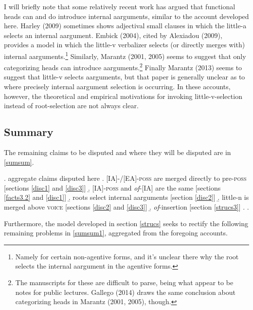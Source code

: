 \documentclass[12pt]{article}
\begin{document}
I will briefly note that some relatively recent work has argued that functional heads can and do introduce internal aarguments, similar to the account developed here. Harley (2009) sometimes shows adjectival small clauses in which the little-a selects an internal aargument. Embick (2004), cited by Alexiadou (2009), provides a model in which the little-v verbalizer selects (or directly merges with) internal aarguments.\footnote{ Namely for certain non-agentive forms, and it's unclear there why the root selects the internal aargument in the agentive forms.} Similarly, Marantz (2001, 2005) seems to suggest that only categorizing heads can introduce aarguments.\footnote{ The manuscripts for these are difficult to parse, being what appear to be notes for public lectures. Gallego (2014) draws the same conclusion about categorizing heads in Marantz (2001, 2005), though.} Finally Marantz (2013) seems to suggest that little-v selects aarguments, but that paper is generally unclear as to where precisely internal aargument selection is occurring. In these accounts, however, the theoretical and empirical motivations for invoking little-v-selection instead of root-selection are not always clear.

\subsection{Summary} \label{priors4}

The remaining claims to be disputed and where they will be disputed are in \ref{sumsum}.

\singlespacing

\ex. \label{sumsum} aggregate claims disputed here
\a. [IA]-/[EA]-\textsc{poss} are merged directly to pre-\textsc{poss} \hfill [sections \ref{disc1} and \ref{disc3}]
\b. [IA]-\textsc{poss} and \textit{of}-[IA] are the same \hfill [sections \ref{facts3.2} and \ref{disc1}]
\b. roots select internal aarguments \hfill [section \ref{disc2}] 
\b. little-n is merged above \textsc{voice} \hfill [sections \ref{disc2} and \ref{disc3}]
\b. \textit{of}-insertion \hfill [section \ref{strucs3}]
\z. \z. \par \par

\doublespacing

Furthermore, the model developed in section \ref{strucs} seeks to rectify the following remaining problems in \ref{sumsum1}, aggregated from the foregoing accounts.

\singlespacing
\end{document}
